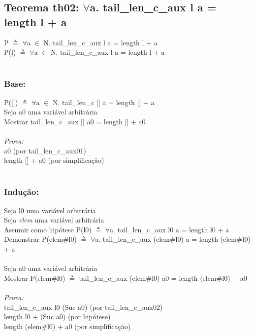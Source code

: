 \documentclass{article}
\begin{document}
\subsection{Teorema th02: $\forall$a. tail\_len\_c\_aux l a = length l + a}
P $\triangleq$ $\forall$a $\in$ N. tail\_len\_c\_aux l a = length l + a
\\P(l) $\triangleq$ $\forall$a $\in$ N. tail\_len\_c\_aux l a = length l + a
\\
\\\subsubsection{Base:} P([]) $\triangleq$ $\forall$a $\in$ N. tail\_len\_c [] a = length [] + a
\\Seja a0 uma variável arbitrária
\\Mostrar tail\_len\_c\_aux [] a0 = length [] + a0
\\
\\\textit{Prova:}
\\a0 (por tail\_len\_c\_aux01)
\\length [] + a0 (por simplificação)
\\
\\\subsubsection{Indução:}
Seja l0 uma variável arbitrária
\\Seja \textit{elem} uma variável arbitrária
\\Assumir como hipótese P(l0) $\triangleq$ $\forall$a. tail\_len\_c\_aux l0 a = length l0 + a
\\Demonstrar P(elem\#l0) $\triangleq$ $\forall$a. tail\_len\_c\_aux (elem\#l0) a = length (elem\#l0) + a
\\
\\Seja a0 uma variável arbitrária
\\Mostrar P(elem\#l0) $\triangleq$ tail\_len\_c\_aux (elem\#l0) a0 = length (elem\#l0) + a0
\\
\\\textit{Prova:}
\\tail\_len\_c\_aux l0 (Suc a0) (por tail\_len\_c\_aux02)
\\length l0 + (Suc a0) (por hipótese)
\\length (elem\#l0) + a0 (por simplificação)
\end{document}
